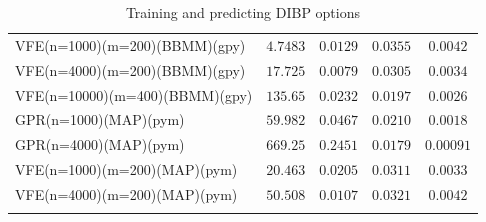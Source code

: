 \documentclass[12pt,a4paper,oneside]{book}
\begin{document}
\begin{table}
\begin{tabular}[t]{lcccc}
VFE(n=1000)(m=200)(BBMM)(gpy)   & $4.7483$  & $0.0129$  & $0.0355$  &    $0.0042$ \\\addlinespace
VFE(n=4000)(m=200)(BBMM)(gpy)   & $17.725$  & $0.0079$  & $0.0305$  &     $0.0034$ \\\addlinespace
VFE(n=10000)(m=400)(BBMM)(gpy)   & $135.65$   & $0.0232$   & $0.0197$  &     $0.0026$ \\\addlinespace
GPR(n=1000)(MAP)(pym)   & $59.982$  & $0.0467$  & $0.0210$  & $0.0018$    \\\addlinespace
GPR(n=4000)(MAP)(pym)   & $669.25$  & $0.2451$  & $0.0179$  & $0.00091$    \\\addlinespace
VFE(n=1000)(m=200)(MAP)(pym)   & $20.463$  & $0.0205$  & $0.0311$  &    $0.0033$ \\\addlinespace
VFE(n=4000)(m=200)(MAP)(pym)   & $50.508$  & $0.0107$  & $0.0321$  &  $0.0042$  \\\addlinespace
\\\bottomrule
\end{tabular}
\caption{Training and predicting DIBP options}\label{Result_DIBP}
\end{table}

\iffalse
\end{document}
